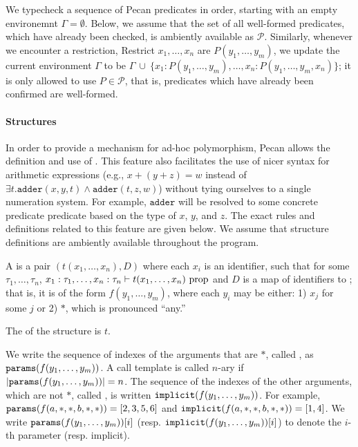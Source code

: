 We typecheck a sequence of Pecan predicates in order, starting with an empty environemnt $\Gamma = \emptyset$.
Below, we assume that the set of all well-formed predicates, which have already been checked, is ambiently available as $\mathcal{P}$.
Similarly, whenever we encounter a restriction, Restrict $x_1, \ldots, x_n$ are $P(y_1, \ldots, y_m)$, we update the current environment $\Gamma$ to be $\Gamma ~\cup~ \{ x_1 : P(y_1, \ldots, y_m), \ldots, x_n : P(y_1, \ldots, y_m, x_n) \} $; it is only allowed to use $P \in \mathcal{P}$, that is, predicates which have already been confirmed are well-formed.

\paragraph{Structures}

In order to provide a mechanism for ad-hoc polymorphism, Pecan allows the definition and use of .
This feature also facilitates the use of nicer syntax for arithmetic expressions (e.g., $x + (y + z) = w$ instead of $\exists t. \texttt{adder}(x, y, t) \land \texttt{adder}(t, z, w)$) without tying ourselves to a single numeration system.
For example, $\texttt{adder}$ will be resolved to some concrete predicate predicate based on the type of $x$, $y$, and $z$.
The exact rules and definitions related to this feature are given below.
We assume that structure definitions are ambiently available throughout the program.

\begin{definition}
    A  is a pair $(t(x_1, \ldots, x_n), D)$ where each $x_i$ is an identifier, such that for some $\tau_1, \ldots, \tau_n$, $x_1 : \tau_1, \ldots, x_n : \tau_n \vdash t(x_1, \ldots, x_n) ~ \text{prop}$ and $D$ is a map of identifiers to ; that is, it is of the form $f(y_1, \ldots, y_m)$, where each $y_i$ may be either: 1) $x_j$ for some $j$ or 2) $*$, which is pronounced ``any.''
    
    The  of the structure is $t$.
\end{definition}

We write the sequence of indexes of the arguments that are $*$, called , as $\texttt{params}(f(y_1, \ldots, y_m))$.
A call template is called $n$-ary if $|\texttt{params}(f(y_1, \ldots, y_m))| = n$.
The sequence of the indexes of the other arguments, which are not $*$, called , is written $\texttt{implicit}(f(y_1, \ldots, y_m))$.
For example, $\texttt{params}(f(a, *, *, b, *, *)) = [2, 3, 5, 6]$ and $\texttt{implicit}(f(a, *, *, b, *, *)) = [1, 4]$.
We write $\texttt{params}(f(y_1, \ldots, y_m))[i]$ (resp. $\texttt{implicit}(f(y_1, \ldots, y_m))[i]$) to denote the $i$-th parameter (resp. implicit).

